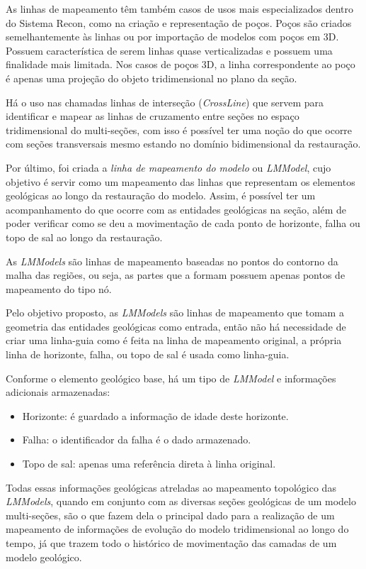 As linhas de mapeamento têm também casos de usos mais especializados dentro do Sistema Recon, como na criação e representação de poços. Poços são criados semelhantemente às linhas ou por importação de modelos com poços em 3D. Possuem característica de serem linhas quase verticalizadas e possuem uma finalidade mais limitada. Nos casos de poços 3D, a linha correspondente ao poço é apenas uma projeção do objeto tridimensional no plano da seção.

Há o uso nas chamadas linhas de interseção (\textit{CrossLine}) que servem para identificar e mapear as linhas de cruzamento entre seções no espaço tridimensional do multi-seções, com isso é possível ter uma noção do que ocorre com seções transversais mesmo estando no domínio bidimensional da restauração.

Por último, foi criada a \textit{linha de mapeamento do modelo} ou \textit{LMModel}, cujo objetivo é servir como um mapeamento das linhas que representam os elementos geológicas ao longo da restauração do modelo. Assim, é possível ter um acompanhamento do que ocorre com as entidades geológicas na seção, além de poder verificar como se deu a movimentação de cada ponto de horizonte, falha ou topo de sal ao longo da restauração.

As \textit{LMModels} são linhas de mapeamento baseadas no pontos do contorno da malha das regiões, ou seja, as partes que a formam possuem apenas pontos de mapeamento do tipo nó.

Pelo objetivo proposto, as \textit{LMModels} são linhas de mapeamento que tomam a geometria das entidades geológicas como entrada, então não há necessidade de criar uma linha-guia como é feita na linha de mapeamento original, a própria linha de horizonte, falha, ou topo de sal é usada como linha-guia.

Conforme o elemento geológico base, há um tipo de \textit{LMModel} e informações adicionais armazenadas:

\renewcommand{\labelitemi}{•}
\begin{itemize}
  \item Horizonte: é guardado a informação de idade deste horizonte.
  \item Falha: o identificador da falha é o dado armazenado.
  \item Topo de sal: apenas uma referência direta à linha original.
\end{itemize}

Todas essas informações  geológicas atreladas ao mapeamento topológico das \textit{LMModels}, quando em conjunto com as diversas seções geológicas de um modelo multi-seções, são o que fazem dela o principal dado para a realização de um mapeamento de informações de evolução do modelo tridimensional ao longo do tempo, já que trazem todo o histórico de movimentação das camadas de um modelo geológico.

